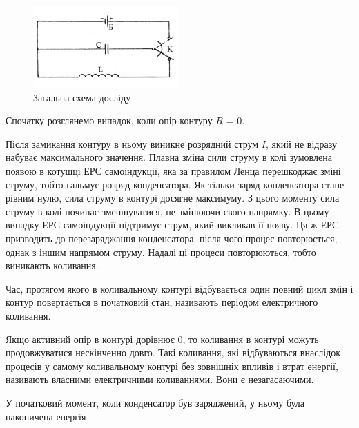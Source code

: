 \documentclass[12pt,a4paper]{article}
\begin{document}
    \begin{figure}[h!]

        \renewcommand{\thefigure}{3.\arabic{figure}} %

        \centering
        \includegraphics[width=0.5\textwidth]{3.2.png}
        \caption{Загальна схема досліду}
        \label{fig2:schema}

    \end{figure}

    Спочатку розглянемо випадок, коли опір контуру $R$ = 0.

    Після замикання контуру в ньому виникне розрядний струм $I$, який не відразу набуває максимального значення.
    Плавна зміна сили струму в колі зумовлена появою в котушці ЕРС самоіндукції, яка за правилом Ленца перешкоджає зміні струму,
    тобто гальмує розряд конденсатора. Як тільки заряд конденсатора стане рівним нулю, сила струму в контурі досягне максимуму.
    З цього моменту сила струму в колі починає зменшуватися, не змінюючи свого напрямку.
    В цьому випадку ЕРС самоіндукції підтримує струм, який викликав її появу.
    Ця ж ЕРС призводить до перезаряджання конденсатора, після чого процес повторюється, однак з іншим напрямом струму.
    Надалі ці процеси повторюються, тобто виникають коливання.

    Час, протягом якого в коливальному контурі відбувається один повний цикл змін і контур повертається в початковий стан, називають періодом електричного коливання.

    Якщо активний опір в контурі дорівнює 0, то коливання в контурі можуть продовжуватися нескінченно довго.
    Такі коливання, які відбуваються внаслідок процесів у самому коливальному контурі без зовнішніх впливів і втрат енергії,
    називають власними електричними коливаннями. Вони є незагасаючими.

    У початковий момент, коли конденсатор був заряджений, у ньому була накопичена енергія
\end{document}

